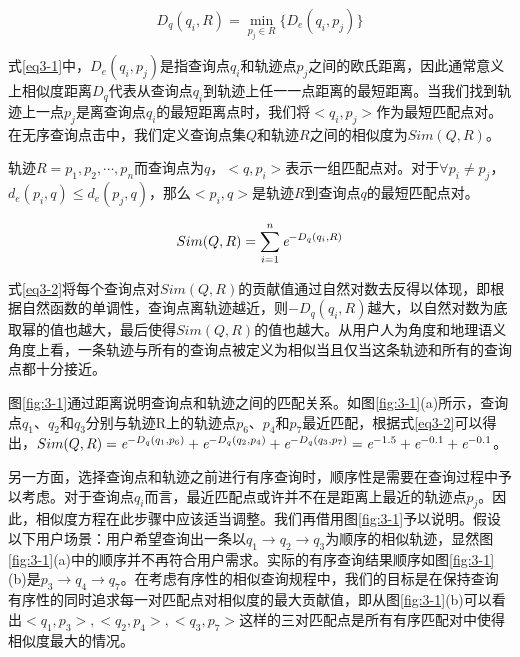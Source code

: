 \begin{equation}
	\label{eq3-1}
	D_{q}(q_{i}, R) = \min_{p_{j} \in R} \{D_{e}(q_{i}, p_{j})\} 
\end{equation}

式\ref{eq3-1}中，$D_{e}(q_{i}, p_{j})$是指查询点$q_{i}$和轨迹点$p_{j}$之间的欧氏距离，因此通常意义上相似度距离$D_{q}$代表从查询点$q_{i}$到轨迹上任一一点距离的最短距离。当我们找到轨迹上一点$p_{j}$是离查询点$q_{i}$的最短距离点时，我们将$<q_{i},p_{j}>$作为最短匹配点对。在无序查询点击中，我们定义查询点集$Q$和轨迹$R$之间的相似度为$Sim(Q,R)$。

\theoremstyle{definition}
\begin{definition}
	轨迹$R={p_{1}, p_{2}, \cdots, p_{n}}$而查询点为$q$，$<q, p_{i}>$表示一组匹配点对。对于$\forall p_{i} \neq p_{j}$， $d_{e}(p_{i}, q)\leq d_{e}(p_{j}, q)$，那么$<p_{i}, q>$是轨迹$R$到查询点$q$的最短匹配点对。
\end{definition}

\begin{equation}
	\label{eq3-2}
	Sim(Q,R) = \sum_{i=1}^{n} \emph{e}^{-D_{q}(q_{i}, R)}
\end{equation}

式\ref{eq3-2}将每个查询点对$Sim(Q,R)$的贡献值通过自然对数去反得以体现，即根据自然函数的单调性，查询点离轨迹越近，则$-D_{q}(q_{i}, R)$越大，以自然对数为底取幂的值也越大，最后使得$Sim(Q,R)$的值也越大。从用户人为角度和地理语义角度上看，一条轨迹与所有的查询点被定义为相似当且仅当这条轨迹和所有的查询点都十分接近。

图\ref{fig:3-1}通过距离说明查询点和轨迹之间的匹配关系。如图\ref{fig:3-1}(a)所示，查询点$q_{1}$、$q_{2}$和$q_{3}$分别与轨迹R上的轨迹点$p_{6}$、$p_{4}$和$p_{7}$最近匹配，根据式\ref{eq3-2}可以得出，$Sim(Q,R) = \emph{e}^{-D_{q}(q_{1}, p_{6})} + \emph{e}^{-D_{q}(q_{2}, p_{4})} + \emph{e}^{-D_{q}(q_{3}, p_{7})} = \emph{e}^{-1.5}+ \emph{e}^{-0.1} + \emph{e}^{-0.1}$。

另一方面，选择查询点和轨迹之前进行有序查询时，顺序性是需要在查询过程中予以考虑。对于查询点$q_{i}$而言，最近匹配点或许并不在是距离上最近的轨迹点$p_{j}$。因此，相似度方程在此步骤中应该适当调整。我们再借用图\ref{fig:3-1}予以说明。假设以下用户场景：用户希望查询出一条以$q_{1} \rightarrow q_{2} \rightarrow q_{3}$为顺序的相似轨迹，显然图\ref{fig:3-1}(a)中的顺序并不再符合用户需求。实际的有序查询结果顺序如图\ref{fig:3-1}(b)是$p_{3} \rightarrow q_{4} \rightarrow q_{7}$。在考虑有序性的相似查询规程中，我们的目标是在保持查询有序性的同时追求每一对匹配点对相似度的最大贡献值，即从图\ref{fig:3-1}(b)可以看出$<q_{1},p_{3}>, <q_{2},p_{4}>, <q_{3},p_{7}>$这样的三对匹配点是所有有序匹配对中使得相似度最大的情况。

